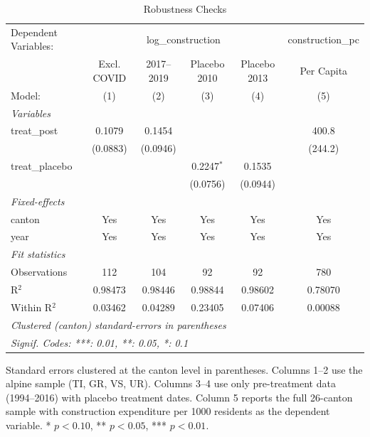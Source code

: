 
\begin{table}[htbp]
   \caption{\label{tab:robustness} Robustness Checks}
   \centering
   \footnotesize
   \begin{tabular}{lccccc}
      \tabularnewline \midrule \midrule
      Dependent Variables: & \multicolumn{4}{c}{log\_construction} & construction\_pc\\
                      & Excl. COVID & 2017--2019 & Placebo 2010 & Placebo 2013 & Per Capita \\   
      Model:          & (1)         & (2)        & (3)          & (4)          & (5)\\  
      \midrule
      \emph{Variables}\\
      treat\_post     & 0.1079      & 0.1454     &              &              & 400.8\\   
                      & (0.0883)    & (0.0946)   &              &              & (244.2)\\   
      treat\_placebo  &             &            & 0.2247$^{*}$ & 0.1535       &   \\   
                      &             &            & (0.0756)     & (0.0944)     &   \\   
      \midrule
      \emph{Fixed-effects}\\
      canton          & Yes         & Yes        & Yes          & Yes          & Yes\\  
      year            & Yes         & Yes        & Yes          & Yes          & Yes\\  
      \midrule
      \emph{Fit statistics}\\
      Observations    & 112         & 104        & 92           & 92           & 780\\  
      R$^2$           & 0.98473     & 0.98446    & 0.98844      & 0.98602      & 0.78070\\  
      Within R$^2$    & 0.03462     & 0.04289    & 0.23405      & 0.07406      & 0.00088\\  
      \midrule \midrule
      \multicolumn{6}{l}{\emph{Clustered (canton) standard-errors in parentheses}}\\
      \multicolumn{6}{l}{\emph{Signif. Codes: ***: 0.01, **: 0.05, *: 0.1}}\\
   \end{tabular}
   
   \par \raggedright 
   Standard errors clustered at the canton level in parentheses. Columns 1--2 use the alpine sample (TI, GR, VS, UR). Columns 3--4 use only pre-treatment data (1994--2016) with placebo treatment dates. Column 5 reports the full 26-canton sample with construction expenditure per 1000 residents as the dependent variable. * $p<0.10$, ** $p<0.05$, *** $p<0.01$.
\end{table}


